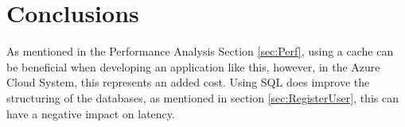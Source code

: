 \documentclass[10pt,a4paper,twocolumn]{article}
\begin{document}
\section {Conclusions}
\label{sec:Conc}
As mentioned in the Performance Analysis Section \ref{sec:Perf}, using a cache can be beneficial when developing an application like this, however, in the Azure Cloud System, this represents an added cost. Using SQL does improve the structuring of the databases, as mentioned in section \ref{sec:RegisterUser}, this can have a negative impact on latency\cite{sqlNOSQLPerformance}.



\end{document}
